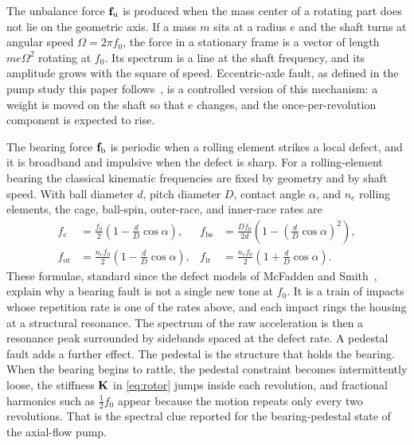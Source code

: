 The unbalance force \(\mathbf{f}_{\mathrm{u}}\) is produced when the mass center of a rotating part does not lie on the geometric axis.
If a mass \(m\) sits at a radius \(e\) and the shaft turns at angular speed \(\Omega=2\pi f_0\), the force in a stationary frame is a vector of length \(m e \Omega^{2}\) rotating at \(f_0\).
Its spectrum is a line at the shaft frequency, and its amplitude grows with the square of speed.
Eccentric-axle fault, as defined in the pump study this paper follows~\cite{you2019}, is a controlled version of this mechanism: a weight is moved on the shaft so that \(e\) changes, and the once-per-revolution component is expected to rise.

The bearing force \(\mathbf{f}_{\mathrm{b}}\) is periodic when a rolling element strikes a local defect, and it is broadband and impulsive when the defect is sharp.
For a rolling-element bearing the classical kinematic frequencies are fixed by geometry and by shaft speed.
With ball diameter \(d\), pitch diameter \(D\), contact angle \(\alpha\), and \(n_{e}\) rolling elements, the cage, ball-spin, outer-race, and inner-race rates are
\begin{align}
f_{\mathrm{c}}&=\frac{f_0}{2}\left(1-\frac{d}{D}\cos\alpha\right),&
f_{\mathrm{bs}}&=\frac{D f_0}{2d}\left(1-\left(\frac{d}{D}\cos\alpha\right)^{2}\right),\\
f_{\mathrm{or}}&=\frac{n_{e} f_0}{2}\left(1-\frac{d}{D}\cos\alpha\right),&
f_{\mathrm{ir}}&=\frac{n_{e} f_0}{2}\left(1+\frac{d}{D}\cos\alpha\right).
\label{eq:bearing}
\end{align}
These formulae, standard since the defect models of McFadden and Smith~\cite{mcfadden1984,randall2011,tandon1999}, explain why a bearing fault is not a single new tone at \(f_0\).
It is a train of impacts whose repetition rate is one of the rates above, and each impact rings the housing at a structural resonance.
The spectrum of the raw acceleration is then a resonance peak surrounded by sidebands spaced at the defect rate.
A pedestal fault adds a further effect.
The pedestal is the structure that holds the bearing.
When the bearing begins to rattle, the pedestal constraint becomes intermittently loose, the stiffness \(\mathbf{K}\) in \eqref{eq:rotor} jumps inside each revolution, and fractional harmonics such as \(\tfrac12 f_0\) appear because the motion repeats only every two revolutions.
That is the spectral clue reported for the bearing-pedestal state of the axial-flow pump.

